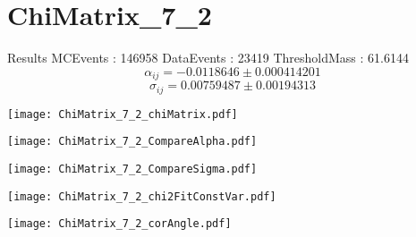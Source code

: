 \documentclass[a4paper,12pt]{article}
\begin{document}
\section{ChiMatrix\_7\_2}
\begin{minipage}{0.49\linewidth} Results \newline
MCEvents : 146958\newline
DataEvents : 23419 \newline
ThresholdMass : 61.6144\\
$$\alpha_{ij} = -0.0118646\pm 0.000414201$$
$$\sigma_{ij} = 0.00759487\pm 0.00194313$$
\end{minipage}\hfill
\begin{minipage}{0.49\linewidth} 
\texttt{[image: ChiMatrix\_7\_2\_chiMatrix.pdf]}\\
\end{minipage}
\hfill
\begin{minipage}{0.49\linewidth} 
\texttt{[image: ChiMatrix\_7\_2\_CompareAlpha.pdf]}\\
\end{minipage}
\hfill
\begin{minipage}{0.49\linewidth} 
\texttt{[image: ChiMatrix\_7\_2\_CompareSigma.pdf]}\\
\end{minipage}
\begin{minipage}{0.49\linewidth} 
\texttt{[image: ChiMatrix\_7\_2\_chi2FitConstVar.pdf]}\\
\end{minipage}
\hfill
\begin{minipage}{0.49\linewidth} 
\texttt{[image: ChiMatrix\_7\_2\_corAngle.pdf]}\\
\end{minipage}
\end{document}
